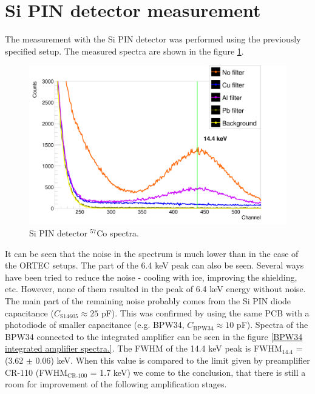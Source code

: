\section{Si PIN detector measurement}
The measurement with the Si PIN detector was performed using the previously specified setup. The measured spectra are shown in the figure \ref{Si PIN detector spectra.}.
\begin{figure}[H]
 \centering
 \includegraphics[scale=0.125, angle = 0]{./pictures/SemiSpectre.png}
 \caption{Si PIN detector $^{57}$Co spectra.}
 \label{Si PIN detector spectra.}
\end{figure}
It can be seen that the noise in the spectrum is much lower than in the case of the ORTEC setups. The part of the 6.4 keV peak can also be seen. Several ways have been tried to reduce the noise - cooling with ice, improving the shielding, etc. However, none of them resulted in the peak of 6.4 keV energy without noise. The main part of the remaining noise probably comes from the Si PIN diode capacitance ($C_{\textrm{S14605}} \approx 25$ pF). This was confirmed by using the same PCB with a photodiode of smaller capacitance (e.g. BPW34, $C_{\textrm{BPW34}} \approx 10$ pF). Spectra of the BPW34 connected to the integrated amplifier can be seen in the figure \ref{BPW34 integrated amplifier spectra.}. The FWHM of the 14.4 keV peak is FWHM$_{14.4}$ = (3.62 $\pm$ 0.06) keV. When this value is compared to the limit given by preamplifier CR-110 (FWHM$_{\textrm{CR-100}}$ = 1.7 keV) we come to the conclusion, that there is still a room for improvement of the following amplification stages.


